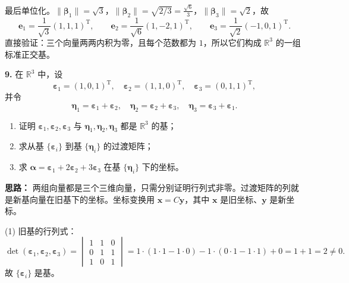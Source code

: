 最后单位化。$\|\boldsymbol{\beta}_1\|=\sqrt3$，$\|\boldsymbol{\beta}_2\|=\sqrt{2/3}=\frac{\sqrt6}{3}$，$\|\boldsymbol{\beta}_3\|=\sqrt2$，故
\[
\boldsymbol{e}_1=\frac{1}{\sqrt3}(1,1,1)^\mathrm{T},\qquad
\boldsymbol{e}_2=\frac{1}{\sqrt6}(1,-2,1)^\mathrm{T},\qquad
\boldsymbol{e}_3=\frac{1}{\sqrt2}(-1,0,1)^\mathrm{T}.
\]
直接验证：三个向量两两内积为零，且每个范数都为 $1$，所以它们构成 $\mathbb{R}^3$ 的一组标准正交基。

\else \answerarea[10] \fi%

\textbf{9.} 在 $\mathbb{R}^3$ 中，设
\[
\boldsymbol{\varepsilon}_1=(1,0,1)^\mathrm{T},\quad
\boldsymbol{\varepsilon}_2=(1,1,0)^\mathrm{T},\quad
\boldsymbol{\varepsilon}_3=(0,1,1)^\mathrm{T},
\]
并令
\[
\boldsymbol{\eta}_1=\boldsymbol{\varepsilon}_1+\boldsymbol{\varepsilon}_2,\quad
\boldsymbol{\eta}_2=\boldsymbol{\varepsilon}_2+\boldsymbol{\varepsilon}_3,\quad
\boldsymbol{\eta}_3=\boldsymbol{\varepsilon}_3+\boldsymbol{\varepsilon}_1.
\]
\begin{enumerate}[label=(\arabic*)]
    \item 证明 $\boldsymbol{\varepsilon}_1,\boldsymbol{\varepsilon}_2,\boldsymbol{\varepsilon}_3$ 与 $\boldsymbol{\eta}_1,\boldsymbol{\eta}_2,\boldsymbol{\eta}_3$ 都是 $\mathbb{R}^3$ 的基；
    \item 求从基 $\{\boldsymbol{\varepsilon}_i\}$ 到基 $\{\boldsymbol{\eta}_i\}$ 的过渡矩阵；
    \item 求 $\boldsymbol{\alpha}=\boldsymbol{\varepsilon}_1+2\boldsymbol{\varepsilon}_2+3\boldsymbol{\varepsilon}_3$ 在基 $\{\boldsymbol{\eta}_i\}$ 下的坐标。
\end{enumerate}

\ifshowsolutions%
\quad
\textbf{思路：} 两组向量都是三个三维向量，只需分别证明行列式非零。过渡矩阵的列就是新基向量在旧基下的坐标。坐标变换用 $\boldsymbol{x}=C\boldsymbol{y}$，其中 $\boldsymbol{x}$ 是旧坐标、$\boldsymbol{y}$ 是新坐标。

(1) 旧基的行列式：
\[
\det(\boldsymbol{\varepsilon}_1,\boldsymbol{\varepsilon}_2,\boldsymbol{\varepsilon}_3)
=\begin{vmatrix}
1&1&0\\
0&1&1\\
1&0&1
\end{vmatrix}
=1\cdot(1\cdot 1-1\cdot 0)-1\cdot(0\cdot 1-1\cdot 1)+0=1+1=2\neq 0.
\]
故 $\{\boldsymbol{\varepsilon}_i\}$ 是基。

